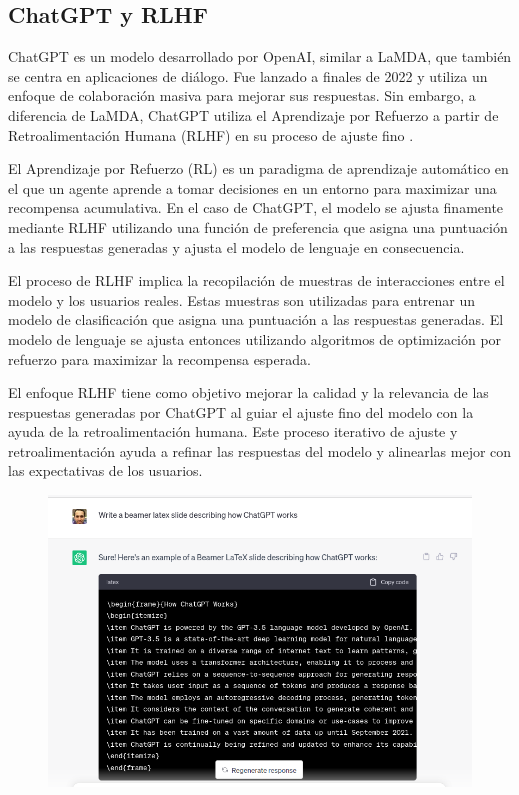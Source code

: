 \subsection{ChatGPT y RLHF}
ChatGPT es un modelo desarrollado por OpenAI, similar a LaMDA, que también se centra en aplicaciones de diálogo. Fue lanzado a finales de 2022 y utiliza un enfoque de colaboración masiva para mejorar sus respuestas. Sin embargo, a diferencia de LaMDA, ChatGPT utiliza el Aprendizaje por Refuerzo a partir de Retroalimentación Humana (RLHF) en su proceso de ajuste fino \cite{ouyang2022training}.

El Aprendizaje por Refuerzo (RL) es un paradigma de aprendizaje automático en el que un agente aprende a tomar decisiones en un entorno para maximizar una recompensa acumulativa. En el caso de ChatGPT, el modelo se ajusta finamente mediante RLHF utilizando una función de preferencia que asigna una puntuación a las respuestas generadas y ajusta el modelo de lenguaje en consecuencia.

El proceso de RLHF implica la recopilación de muestras de interacciones entre el modelo y los usuarios reales. Estas muestras son utilizadas para entrenar un modelo de clasificación que asigna una puntuación a las respuestas generadas. El modelo de lenguaje se ajusta entonces utilizando algoritmos de optimización por refuerzo para maximizar la recompensa esperada.

El enfoque RLHF tiene como objetivo mejorar la calidad y la relevancia de las respuestas generadas por ChatGPT al guiar el ajuste fino del modelo con la ayuda de la retroalimentación humana. Este proceso iterativo de ajuste y retroalimentación ayuda a refinar las respuestas del modelo y alinearlas mejor con las expectativas de los usuarios.

\begin{figure}[h]
	\includegraphics[scale = 0.25]{pics/chatgpt.png}
\end{figure}

